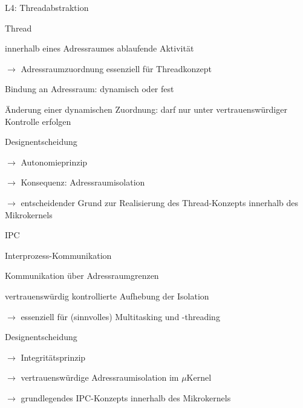 \documentclass[a4paper]{article}
\begin{document}
\begin{multicols}{3}
    L4: Threadabstraktion
    \begin{itemize*}
        \item Thread
        \begin{itemize*}
            \item innerhalb eines Adressraumes ablaufende Aktivität
            \item[$\rightarrow$] Adressraumzuordnung essenziell für Threadkonzept
            \item Bindung an Adressraum: dynamisch oder fest
            \item Änderung einer dynamischen Zuordnung: darf nur unter vertrauenswürdiger Kontrolle erfolgen
        \end{itemize*}
        \item Designentscheidung
        \begin{itemize*}
            \item[$\rightarrow$] Autonomieprinzip
            \item[$\rightarrow$] Konsequenz: Adressraumisolation
            \item[$\rightarrow$] entscheidender Grund zur Realisierung des Thread-Konzepts innerhalb des Mikrokernels
        \end{itemize*}
    \end{itemize*}

    IPC
    \begin{itemize*}
        \item Interprozess-Kommunikation
        \begin{itemize*}
            \item Kommunikation über Adressraumgrenzen
            \item vertrauenswürdig kontrollierte Aufhebung der Isolation
            \item[$\rightarrow$] essenziell für (sinnvolles) Multitasking und -threading
        \end{itemize*}
        \item Designentscheidung
        \begin{itemize*}
            \item[$\rightarrow$] Integritätsprinzip
            \item[$\rightarrow$] vertrauenswürdige Adressraumisolation im $\mu$Kernel
            \item[$\rightarrow$] grundlegendes IPC-Konzepts innerhalb des Mikrokernels
        \end{itemize*}
    \end{itemize*}


\end{multicols}
\end{document}
